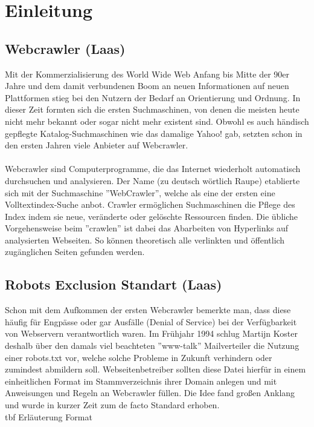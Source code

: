 \chapter{Einleitung}

\section{Webcrawler (Laas)}
Mit der Kommerzialisierung des World Wide Web Anfang bis Mitte der 90er Jahre und dem damit verbundenen Boom an neuen Informationen auf neuen Plattformen stieg bei den Nutzern der Bedarf an Orientierung und Ordnung. In dieser Zeit formten sich die ersten Suchmaschinen, von denen die meisten heute nicht mehr bekannt oder sogar nicht mehr existent sind. Obwohl es auch händisch gepflegte Katalog-Suchmaschinen wie das damalige Yahoo! gab, setzten schon in den ersten Jahren viele Anbieter auf Webcrawler.\\\\
Webcrawler sind Computerprogramme, die das Internet wiederholt automatisch durchsuchen und analysieren. Der Name (zu deutsch wörtlich Raupe) etablierte sich mit der Suchmaschine ''WebCrawler'', welche als eine der ersten eine Volltextindex-Suche anbot. Crawler ermöglichen Suchmaschinen die Pflege des Index indem sie neue, veränderte oder gelöschte Ressourcen finden. Die übliche Vorgehensweise beim ''crawlen'' ist dabei das Abarbeiten von Hyperlinks auf analysierten Webseiten. So können theoretisch alle verlinkten und öffentlich zugänglichen Seiten gefunden werden.

\section{Robots Exclusion Standart (Laas)}
Schon mit dem Aufkommen der ersten Webcrawler bemerkte man, dass diese häufig für Engpässe oder gar Ausfälle (Denial of Service) bei der Verfügbarkeit von Webservern verantwortlich waren. Im Frühjahr 1994 schlug Martijn Koster deshalb über den damals viel beachteten ''www-talk'' Mailverteiler die Nutzung einer robots.txt vor, welche solche Probleme in Zukunft verhindern oder zumindest abmildern soll. Webseitenbetreiber sollten diese Datei hierfür in einem einheitlichen Format im Stammverzeichnis ihrer Domain anlegen und mit Anweisungen und Regeln an Webcrawler füllen. Die Idee fand großen Anklang und wurde in kurzer Zeit zum de facto Standard erhoben.\\
tbf Erläuterung Format
